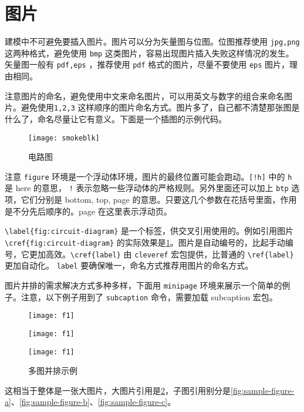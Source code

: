 \section{图片}

建模中不可避免要插入图片。图片可以分为矢量图与位图。位图推荐使用 \verb|jpg,png| 这两种格式，避免使用 \verb|bmp| 这类图片，容易出现图片插入失败这样情况的发生。矢量图一般有 \verb|pdf,eps| ，推荐使用 \verb|pdf|  格式的图片，尽量不要使用 \verb|eps| 图片，理由相同。

注意图片的命名，避免使用中文来命名图片，可以用英文与数字的组合来命名图片。避免使用\verb|1,2,3| 这样顺序的图片命名方式。图片多了，自己都不清楚那张图是什么了，命名尽量让它有意义。下面是一个插图的示例代码。
\begin{figure}[!h]
	\centering
	\texttt{[image: smokeblk]}
	\caption{电路图}
	\label{fig:circuit-diagram}
\end{figure}

注意 \verb|figure| 环境是一个浮动体环境，图片的最终位置可能会跑动。\verb|[!h]| 中的 \verb|h| 是 here 的意思， \verb|!| 表示忽略一些浮动体的严格规则。另外里面还可以加上 \verb|btp| 选项，它们分别是 bottom, top, page 的意思。只要这几个参数在花括号里面，作用是不分先后顺序的。page 在这里表示浮动页。

\verb|\label{fig:circuit-diagram}| 是一个标签，供交叉引用使用的。例如引用图片 \verb|\cref{fig:circuit-diagram}| 的实际效果是\cref{fig:circuit-diagram}。图片是自动编号的，比起手动编号，它更加高效。\verb|\cref{label}| 由 \verb|cleveref| 宏包提供，比普通的 \verb|\ref{label}| 更加自动化。 \verb|label| 要确保唯一，命名方式推荐用图片的命名方式。

图片并排的需求解决方式多种多样，下面用 \verb|minipage| 环境来展示一个简单的例子。注意，以下例子用到了 \verb|subcaption| 命令，需要加载 subcaption 宏包。

\begin{figure}
	\centering
	\begin{minipage}[c]{0.3\textwidth}
		\centering
		\texttt{[image: f1]}
		\label{fig:sample-figure-a}
	\end{minipage}
	\begin{minipage}[c]{0.3\textwidth}
		\centering
		\texttt{[image: f1]}
		\label{fig:sample-figure-b}
	\end{minipage}
	\begin{minipage}[c]{0.3\textwidth}
		\centering
		\texttt{[image: f1]}
		\label{fig:sample-figure-c}
	\end{minipage}
	\caption{多图并排示例}
	\label{fig:sample-figure}
\end{figure}
这相当于整体是一张大图片，大图片引用是\cref{fig:sample-figure}，子图引用别分是\cref{fig:sample-figure-a}、\cref{fig:sample-figure-b}、\cref{fig:sample-figure-c}。

